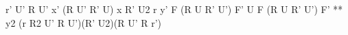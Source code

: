 r' U' R U' x' (R U' R' U) x R' U2 r
y' F (R U R' U') F' U F (R U R' U') F' **
y2 (r R2 U' R U')(R' U2)(R U' R r')
